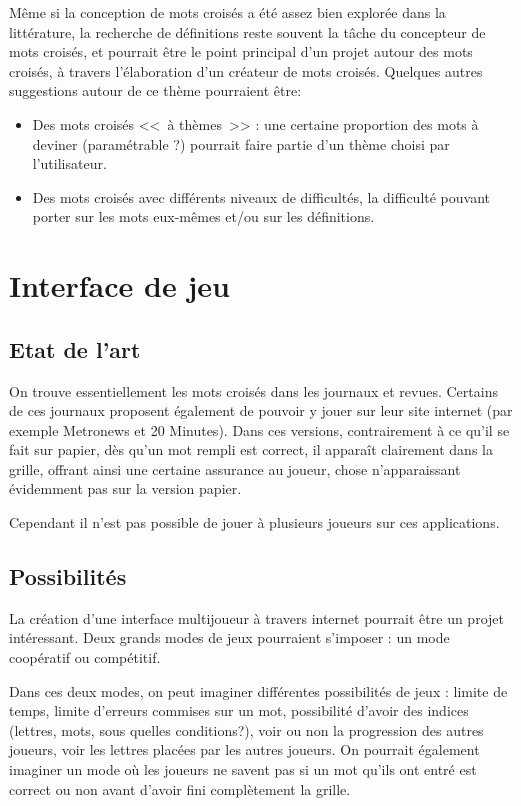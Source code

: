 \documentclass{article}
\begin{document}
Même si la conception de mots croisés a été assez bien explorée dans la littérature, la recherche de définitions reste souvent la tâche du concepteur de mots croisés, et pourrait être le point principal d'un projet autour des mots croisés, à travers l'élaboration d'un créateur de mots croisés. Quelques autres suggestions autour de ce thème pourraient être:

\begin{itemize}
	\item Des mots croisés <<~à thèmes~>> : une certaine proportion des mots à deviner (paramétrable ?) pourrait faire partie d'un thème choisi par l'utilisateur.
	\item Des mots croisés avec différents niveaux de difficultés, la difficulté pouvant porter sur les mots eux-mêmes et/ou sur les définitions.
\end{itemize}

\section{Interface de jeu}

\subsection{Etat de l'art}

On trouve essentiellement les mots croisés dans les journaux et revues. Certains de ces journaux proposent également de pouvoir y jouer sur leur site internet (par exemple Metronews et 20 Minutes). Dans ces versions, contrairement à ce qu'il se fait sur papier, dès qu'un mot rempli est correct, il apparaît clairement dans la grille, offrant ainsi une certaine assurance au joueur, chose n'apparaissant évidemment pas sur la version papier.

Cependant il n'est pas possible de jouer à plusieurs joueurs sur ces applications.

\subsection{Possibilités}

La création d'une interface multijoueur à travers internet pourrait être un projet intéressant. Deux grands modes de jeux pourraient s'imposer : un mode coopératif ou compétitif.

Dans ces deux modes, on peut imaginer différentes possibilités de jeux : limite de temps, limite d'erreurs commises sur un mot, possibilité d'avoir des indices (lettres, mots, sous quelles conditions?), voir ou non la progression des autres joueurs, voir les lettres placées par les autres joueurs. On pourrait également imaginer un mode où les joueurs ne savent pas si un mot qu'ils ont entré est correct ou non avant d'avoir fini complètement la grille.
\end{document}
